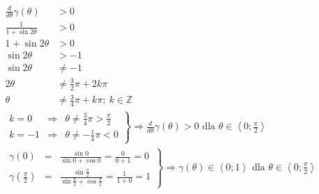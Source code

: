         \begin{align*}
        	\frac{d}{d\theta}\gamma\left( \theta\right)& > 0& \hspace{10cm}\\
        	\frac{
        		1
        	}{
        		1 + \sin 2\theta
        	} & > 0\\
        	1 + \sin 2\theta & > 0\\
        	 \sin 2\theta & > -1\\
        	 \sin 2\theta & \neq -1\\
        	 2\theta & \neq \frac{3}{2}\pi + 2k\pi\\
        	 \theta & \neq \frac{3}{4}\pi + k\pi ; \ k \in \mathbb{Z}
        \end{align*}
       	\begin{align*}
       		\left. \begin{array}{rcl}
       		 k = 0 & \Rightarrow & \theta \neq \frac{3}{4}\pi > \frac{\pi}{2}  \\
    	 	 k = -1 & \Rightarrow &\theta \neq -\frac{1}{4}\pi < 0
    	 	\end{array}    \right\}\Rightarrow \frac{d}{d\theta}\gamma\left( \theta\right) > 0 \text{ dla } \theta \in \left\langle 0;\frac{\pi}{2}\right\rangle& \hspace{10cm}
        \end{align*}
       	\begin{align*}
       	\left. \begin{array}{rcl}
       		\gamma\left( 0\right) & = &\frac{\sin 0}{\sin 0 + \cos 0} = \frac{0}{0 + 1} = 0\\	
       		\gamma\left( \frac{\pi}{2}\right) & = &\frac{\sin  \frac{\pi}{2}}{\sin  \frac{\pi}{2} + \cos  \frac{\pi}{2}} = \frac{1}{1 + 0}= 1
       	\end{array} \right\} \Rightarrow \gamma\left( \theta\right) \in \left\langle 0;1\right\rangle \text{ dla } \theta \in \left\langle 0;\frac{\pi}{2}\right\rangle& \hspace{10cm}
        \end{align*}